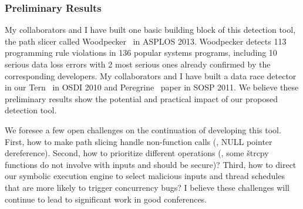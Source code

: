 



 

\vspace{-.15in}\subsubsection{Preliminary Results}
\label{sec:detect-result}\vspace{-.075in}

My collaborators and I have built one basic building block of this detection 
tool, the path slicer called Woodpecker~\cite{woodpecker:asplos13} in ASPLOS 
2013. Woodpecker detects 113 programming rule violations in 136 popular systems 
programs, including 10 serious data loss errors with 2 most serious ones 
already confirmed by the corresponding developers. My collaborators and I have 
built a data race detector in our Tern~\cite{cui:tern:osdi10} in OSDI 2010 and 
Peregrine~\cite{peregrine:sosp11} paper in SOSP 2011. We believe these 
preliminary results show the potential and practical impact of our proposed 
detection tool.



We foresee a few open challenges on the continuation of developing this tool. 
First, how to make path slicing handle non-function calls (\eg, NULL pointer 
dereference). Second, how to prioritize different operations (\eg, some 
\v{strcpy} functions do not involve with inputs and should be secure)? Third, 
how to direct our symbolic execution engine to select malicious inputs and 
thread schedules that are more likely to trigger concurrency bugs? I believe 
these challenges will continue to lead to significant work in good conferences.

